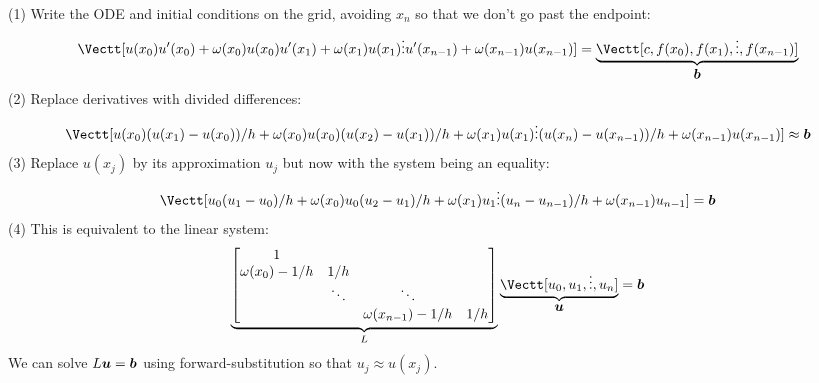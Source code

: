(1) Write the ODE and initial conditions on the grid, avoiding $x_n$ so that we don't go past the endpoint:
\[
\Vectt[u(x_0) \\ 
u'(x_0) + \ensuremath{\omega}(x_0) u(x_0) \\
u'(x_1) + \ensuremath{\omega}(x_1) u(x_1) \\
\ensuremath{\vdots} \\
u'(x_{n-1})+ \ensuremath{\omega}(x_{n-1}) u(x_{n-1})] = \underbrace{\Vectt[c, f(x_0), f(x_1), \ensuremath{\vdots} , f(x_{n-1})]}_{\ensuremath{\bm{\b}}}
\]
(2) Replace derivatives with divided differences:
\[
\Vectt[u(x_0) \\ 
(u(x_1) - u(x_0))/h + \ensuremath{\omega}(x_0)u(x_0) \\
(u(x_2) - u(x_1))/h + \ensuremath{\omega}(x_1)u(x_1) \\
\ensuremath{\vdots} \\
(u(x_n) - u(x_{n-1}))/h + \ensuremath{\omega}(x_{n-1})u(x_{n-1})] \ensuremath{\approx} \ensuremath{\bm{\b}}
\]
(3) Replace $u(x_j)$  by its approximation $u_j$ but now with the system being an equality:
\[
\Vectt[u_0 \\ 
(u_1 - u_0)/h + \ensuremath{\omega}(x_0) u_0 \\
(u_2 - u_1)/h + \ensuremath{\omega}(x_1) u_1 \\
\ensuremath{\vdots} \\
(u_n - u_{n-1})/h  + \ensuremath{\omega}(x_{n-1}) u_{n-1}] = \ensuremath{\bm{\b}}
\]
(4) This is equivalent to the linear system:
\[
\underbrace{\begin{bmatrix}
    1 \\ 
    \ensuremath{\omega}(x_0)-1/h & 1/h \\
    & \ensuremath{\ddots} & \ensuremath{\ddots} \\
    && \ensuremath{\omega}(x_{n-1})-1/h & 1/h \end{bmatrix}}_L \underbrace{\Vectt[u_0,u_1,\ensuremath{\vdots},u_n]}_{\ensuremath{\bm{\u}}} = \ensuremath{\bm{\b}}
\]
We can solve $L \bm{{\mbox{\boldmath$u$\unboldmath}}} = \bm{{\mbox{\boldmath$b$\unboldmath}}}$ using forward-substitution so that $u_j \ensuremath{\approx} u(x_j)$.

